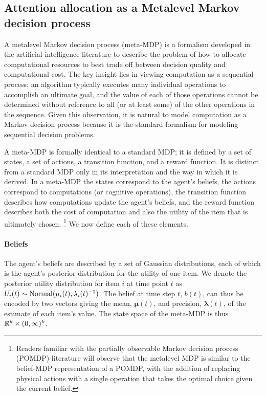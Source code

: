 \documentclass[12pt,a4paperpaper,]{article}
\begin{document}
\subsection{Attention allocation as a Metalevel Markov decision process}

A metalevel Markov decision process (meta-MDP) is a formalism developed in the artificial intelligence literature to describe the problem of how to allocate computational resources to best trade off between decision quality and computational cost. The key insight lies in viewing computation as a sequential process; an algorithm typically executes many individual operations to accomplish an ultimate goal, and the value of each of those operations cannot be determined without reference to all (or at least some) of the other operations in the sequence. Given this observation, it is natural to model computation as a Markov decision process because it is the standard formalism for modeling sequential decision problems.

A meta-MDP is formally identical to a standard MDP; it is defined by a set of states, a set of actions, a transition function, and a reward function. It is distinct from a standard MDP only in its interpretation and the way in which it is derived. In a meta-MDP the states correspond to the agent's beliefs, the actions correspond to computations (or cognitive operations), the transition function describes how computations update the agent's beliefs, and the reward function describes both the cost of computation and also the utility of the item that is ultimately chosen.%
  \footnote{Readers familiar with the partially observable Markov decision process (POMDP) literature will observe that the metalevel MDP is similar to the belief-MDP representation of a POMDP, with the addition of replacing physical actions with a single operation that takes the optimal choice given the current belief.}
We now define each of these elements.


\paragraph{Beliefs}
The agent's beliefs are described by a set of Gaussian distributions, each of which is the agent's posterior distribution for the utility of one item. We denote the posterior utility distribution for item $i$ at time point $t$ as $U_i(t) \sim \mathrm{Normal}(\mu_i(t), \lambda_i(t)^{-1})$. The belief at time step $t$, $b(t)$, can thus be encoded by two vectors giving the mean, $\boldsymbol{\mu}(t)$, and precision, $\boldsymbol{\lambda}(t)$, of the estimate of each item's value. The state space of the meta-MDP is thus $\mathbb{R}^k \times (0,\infty)^k$.
\end{document}
